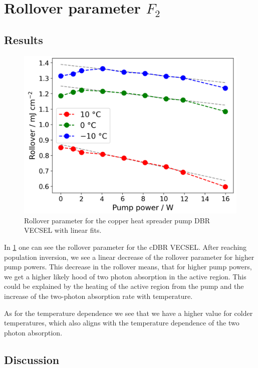 \section{\texorpdfstring{Rollover parameter $F_2$}{Rollover parameter F2}}
\subsection*{Results}

\begin{figure}
    \vspace{-1.5\baselineskip}
    \centering
    \includegraphics[width=.98\textwidth]{images/param3.png}
    \caption{Rollover parameter for the copper heat spreader pump DBR VECSEL with linear fits.}
    \label{fig:f2}
\end{figure}
In \cref{fig:f2} one can see the rollover parameter for the cDBR VECSEL. After reaching population inversion, we see a linear decrease of the rollover parameter for higher pump powers. This decrease in the rollover means, that for higher pump powers, we get a higher likely hood of two photon absorption in the active region. This could be explained by the heating of the active region from the pump and the increase of the two-photon absorption rate with temperature.

As for the temperature dependence we see that we have a higher value for colder temperatures, which also aligns with the temperature dependence of the two photon absorption. 
\vspace{-\baselineskip}
\subsection*{Discussion}

